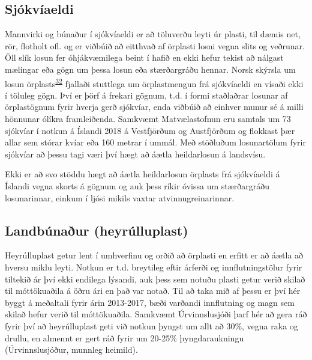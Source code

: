 \documentclass[icelandic,]{book}
\begin{document}
\hypertarget{sjokviaeldi}{%
\subsection*{Sjókvíaeldi}\label{sjokviaeldi}}

Mannvirki og búnaður í sjókvíaeldi er að töluverðu leyti úr plasti, til dæmis net, rör, flotholt ofl. og er viðbúið að eitthvað af örplasti losni vegna slits og veðrunar. Öll slík losun fer óhjákvæmilega beint í hafið en ekki hefur tekist að nálgast mælingar eða gögn um þessa losun eða stærðargráðu hennar. Norsk skýrsla um losun örplasts\textsuperscript{\protect\hyperlink{ref-sundt2014sources}{32}} fjallaði stuttlega um örplastmengun frá sjókvíaeldi en vísaði ekki í töluleg gögn. Því er þörf á frekari gögnum, t.d. í formi staðlaðrar losunar af örplastögnum fyrir hverja gerð sjókvíar, enda viðbúið að einhver munur sé á milli hönnunar ólíkra framleiðenda.
Samkvæmt Matvælastofnun eru samtals um 73 sjókvíar í notkun á Íslandi 2018 á Vestfjörðum og Austfjörðum og flokkast þær allar sem stórar kvíar eða 160 metrar í ummál. Með stöðluðum losunartölum fyrir sjókvíar að þessu tagi væri því hægt að áætla heildarlosun á landsvísu.

Ekki er að svo stöddu hægt að áætla heildarlosun örplasts frá sjókvíaeldi á Íslandi vegna skorts á gögnum og auk þess ríkir óvissa um stærðargráðu losunarinnar, einkum í ljósi mikils vaxtar atvinnugreinarinnar.

\hypertarget{landbunaur-heyrulluplast}{%
\subsection*{Landbúnaður (heyrúlluplast)}\label{landbunaur-heyrulluplast}}

Heyrúlluplast getur lent í umhverfinu og orðið að örplasti en erfitt er að áætla að hversu miklu leyti. Notkun er t.d. breytileg eftir árferði og innflutningstölur fyrir tiltekið ár því ekki endilega lýsandi, auk þess sem notuðu plasti getur verið skilað til móttökuaðila á öðru ári en það var notað. Til að taka mið af þessu er því hér byggt á meðaltali fyrir árin 2013-2017, bæði varðandi innflutning og magn sem skilað hefur verið til móttökuaðila. Samkvæmt Úrvinnslusjóði þarf hér að gera ráð fyrir því að heyrúlluplast geti við notkun þyngst um allt að 30\%, vegna raka og drullu, en almennt er gert ráð fyrir um 20-25\% þyngdaraukningu (Úrvinnslusjóður, munnleg heimild).
\end{document}
